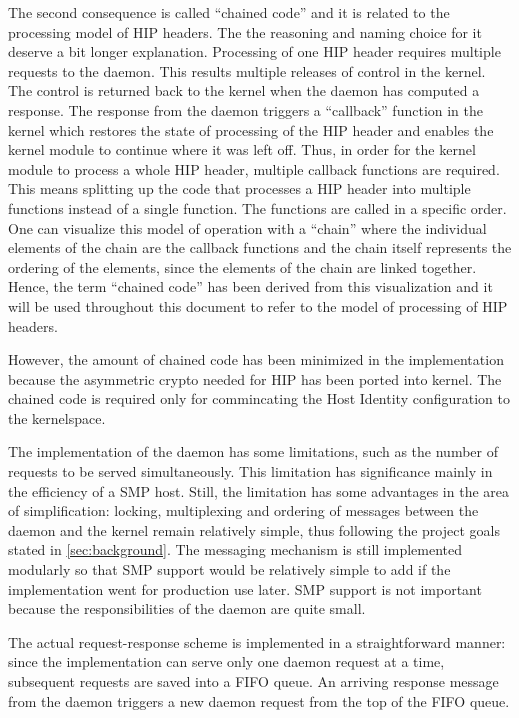 The second consequence is called ``chained code'' and it is related to
the processing model of HIP headers. The the reasoning and naming
choice for it deserve a bit longer explanation. Processing of one HIP
header requires multiple requests to the daemon. This results multiple
releases of control in the kernel. The control is returned back to the
kernel when the daemon has computed a response. The response from the
daemon triggers a ``callback'' function in the kernel which restores
the state of processing of the HIP header and enables the kernel
module to continue where it was left off. Thus, in order for the
kernel module to process a whole HIP header, multiple callback
functions are required. This means splitting up the code that
processes a HIP header into multiple functions instead of a single
function. The functions are called in a specific order. One can
visualize this model of operation with a ``chain'' where the
individual elements of the chain are the callback functions and the
chain itself represents the ordering of the elements, since the
elements of the chain are linked together. Hence, the term ``chained
code'' has been derived from this visualization and it will be used
throughout this document to refer to the model of processing of HIP
headers.

However, the amount of chained code has been minimized in the
implementation because the asymmetric crypto needed for HIP has been
ported into kernel. The chained code is required only for commincating
the Host Identity configuration to the kernelspace.

The implementation of the daemon has some limitations, such as the
number of requests to be served simultaneously. This limitation has
significance mainly in the efficiency of a SMP host. Still, the
limitation has some advantages in the area of simplification: locking,
multiplexing and ordering of messages between the daemon and the
kernel remain relatively simple, thus following the project goals
stated in \autoref{sec:background}. The messaging mechanism is still
implemented modularly so that SMP support would be relatively simple
to add if the implementation went for production use later. SMP
support is not important because the responsibilities of the daemon
are quite small.

The actual request-response scheme is implemented in a straightforward
manner: since the implementation can serve only one daemon request at
a time, subsequent requests are saved into a FIFO queue. An arriving
response message from the daemon triggers a new daemon request from
the top of the FIFO queue.

